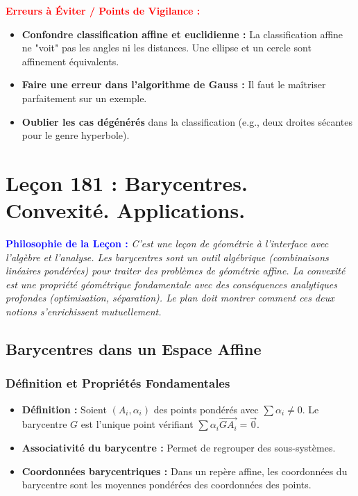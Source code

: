 \documentclass[12pt, a4paper, parskip=full]{report}
\theoremstyle{agregstyle}
\newenvironment{philosophie}
  {\par\medskip\noindent\begin{oframed}\noindent\textbf{\textcolor{blue}{Philosophie de la Leçon :}}\itshape}
  {\end{oframed}\par\medskip}
\newenvironment{erreurs}
  {\par\medskip\noindent\begin{oframed}\noindent\textbf{\textcolor{red}{Erreurs à Éviter / Points de Vigilance :}}}
  {\end{oframed}\par\medskip}
\begin{document}
\begin{erreurs}
    \begin{itemize}
        \item \textbf{Confondre classification affine et euclidienne :} La classification affine ne "voit" pas les angles ni les distances. Une ellipse et un cercle sont affinement équivalents.
        \item \textbf{Faire une erreur dans l'algorithme de Gauss :} Il faut le maîtriser parfaitement sur un exemple.
        \item \textbf{Oublier les cas dégénérés} dans la classification (e.g., deux droites sécantes pour le genre hyperbole).
    \end{itemize}
\end{erreurs}

\newpage
\chapter{Leçon 181 : Barycentres. Convexité. Applications.}

\begin{philosophie}
    C'est une leçon de géométrie à l'interface avec l'algèbre et l'analyse. Les barycentres sont un outil algébrique (combinaisons linéaires pondérées) pour traiter des problèmes de géométrie affine. La convexité est une propriété géométrique fondamentale avec des conséquences analytiques profondes (optimisation, séparation). Le plan doit montrer comment ces deux notions s'enrichissent mutuellement.
\end{philosophie}

\section{Barycentres dans un Espace Affine}
\subsection{Définition et Propriétés Fondamentales}
\begin{itemize}
    \item \textbf{Définition :} Soient $(A_i, \alpha_i)$ des points pondérés avec $\sum \alpha_i \neq 0$. Le barycentre $G$ est l'unique point vérifiant $\sum \alpha_i \vec{GA_i} = \vec{0}$.
    \item \textbf{Associativité du barycentre :} Permet de regrouper des sous-systèmes.
    \item \textbf{Coordonnées barycentriques :} Dans un repère affine, les coordonnées du barycentre sont les moyennes pondérées des coordonnées des points.
\end{itemize}
\end{document}
